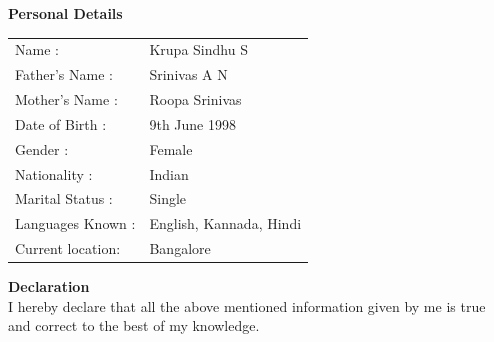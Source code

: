 \documentclass[letterpaper,11pt,oneside]{article}
\begin{document}
\begin{flushleft}	
	\vspace{2ex}
	\textbf{{\normalsize  Personal Details\\}}
	\vspace{2ex}
	
	\begin{tabular}{l l}
		Name			:  & Krupa Sindhu S\\
		Father’s Name   :  &Srinivas A N\\ 
		Mother’s Name   :  &Roopa Srinivas\\
		Date of Birth	:  &9th June 1998\\
		Gender			:  &Female\\
		Nationality		:  &Indian\\
		Marital Status 	:  &Single\\
		Languages Known	:  &English, Kannada, Hindi\\
		Current location:  &Bangalore\\
	\end{tabular}

\vspace{2ex}
\textbf{{\large Declaration\\}}
\vspace{2ex}
I hereby declare that all the above mentioned information given by me is true and correct to the best of my knowledge.\\
\end{flushleft}
\end{document}
